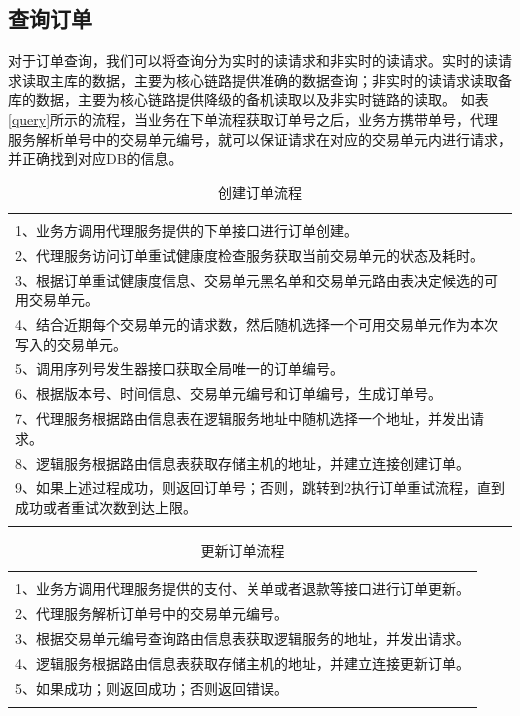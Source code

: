 \documentclass[letterpaper,twocolumn,10pt]{article}
\begin{document}
\subsection{查询订单}
对于订单查询，我们可以将查询分为实时的读请求和非实时的读请求。实时的读请求读取主库的数据，主要为核心链路提供准确的数据查询；非实时的读请求读取备库的数据，主要为核心链路提供降级的备机读取以及非实时链路的读取。
如表\ref{query}所示的流程，当业务在下单流程获取订单号之后，业务方携带单号，代理服务解析单号中的交易单元编号，就可以保证请求在对应的交易单元内进行请求，并正确找到对应DB的信息。


\begin{table}[htp]
\caption{创建订单流程}
\begin{center}
\begin{tabular}{l}
\hline
\\
1、业务方调用代理服务提供的下单接口进行订单创建。\\
2、代理服务访问订单重试健康度检查服务获取当前交易单元的状态及耗时。 \\
3、根据订单重试健康度信息、交易单元黑名单和交易单元路由表决定候选的可用交易单元。\\
4、结合近期每个交易单元的请求数，然后随机选择一个可用交易单元作为本次写入的交易单元。\\
5、调用序列号发生器接口获取全局唯一的订单编号。 \\
6、根据版本号、时间信息、交易单元编号和订单编号，生成订单号。\\
7、代理服务根据路由信息表在逻辑服务地址中随机选择一个地址，并发出请求。\\
8、逻辑服务根据路由信息表获取存储主机的地址，并建立连接创建订单。\\
9、如果上述过程成功，则返回订单号；否则，跳转到2执行订单重试流程，直到成功或者重试次数到达上限。\\
\\
\hline
\end{tabular}
\end{center}
\label{create}
\end{table}%


\begin{table}[htp]
\caption{更新订单流程}
\begin{center}
\begin{tabular}{l}
\hline
\\
1、业务方调用代理服务提供的支付、关单或者退款等接口进行订单更新。\\
2、代理服务解析订单号中的交易单元编号。 \\
3、根据交易单元编号查询路由信息表获取逻辑服务的地址，并发出请求。 \\
4、逻辑服务根据路由信息表获取存储主机的地址，并建立连接更新订单。\\
5、如果成功；则返回成功；否则返回错误。\\
\\
\hline
\end{tabular}
\end{center}
\label{update}
\end{table}%
\end{document}
